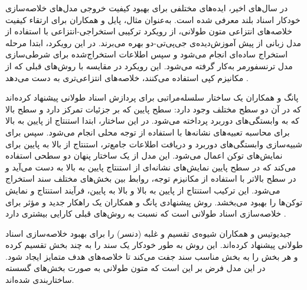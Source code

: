 
در سال‌های اخیر، ایده‌های مختلفی برای بهبود کیفیت خروجی مدل‌های خلاصه‌سازی خودکار اسناد بلند معرفی شده است. به‌عنوان مثال، پایل و همکاران برای ارتقاء کیفیت خلاصه‌های انتزاعی متون طولانی، از رویکرد ترکیبی استخراجی-انتزاعی با استفاده از مدل زبانی از پیش آموزش‌دیده‌ی جی‌پی‌تی-دو بهره می‌برند. در این رویکرد، ابتدا مرحله استخراج ساده‌ای انجام می‌شود و سپس اطلاعات استخراج‌شده برای شرطی‌سازی مدل ترنسفورمر به‌کار گرفته می‌شود. این رویکرد در مقایسه با روش‌های قبلی که از مکانیزم کپی استفاده می‌کنند، خلاصه‌های انتزاعی‌تری به دست می‌دهد \cite{pilault2020extractive}.

پانگ و همکاران یک ساختار سلسله‌مراتبی برای پردازش اسناد طولانی پیشنهاد کرده‌اند که در آن دو سطح مختلف وجود دارد: سطح پایین که بر جزئیات تمرکز دارد و سطح بالا که به وابستگی‌های دوربرد پرداخته می‌شود. در این ساختار، ابتدا استنتاج از پایین به بالا برای محاسبه تعبیه‌های نشانه‌ها با استفاده از توجه محلی انجام می‌شود. سپس برای شبیه‌سازی وابستگی‌های دوربرد و دریافت اطلاعات جامع‌تر، استنتاج از بالا به پایین برای نمایش‌های توکن اعمال می‌شود. این مدل از یک ساختار پنهان دو سطحی استفاده می‌کند که در سطح پایین نمایش‌های نشانه‌ای از استنتاج پایین به بالا به دست می‌آید و در سطح بالاتر با استفاده از مکانیزم توجه، روابط بین بخش‌های مختلف سند استخراج می‌شود. این ترکیب استنتاج از پایین به بالا و بالا به پایین، فرآیند استنتاج و نمایش توکن‌ها را بهبود می‌بخشد. روش پیشنهادی پانگ و همکاران یک راهکار جدید و مؤثر برای خلاصه‌سازی اسناد طولانی است که نسبت به روش‌های قبلی کارایی بیشتری دارد \cite{pang2023long}.



جیدیوتیس و همکاران شیوه‌ی تقسیم و غلبه (دنسر) را برای بهبود خلاصه‌سازی اسناد طولانی پیشنهاد کرده‌اند. این روش به طور خودکار یک سند را به چند بخش تقسیم کرده و هر بخش را به بخش مناسب سند جفت می‌کند تا خلاصه‌های هدف متمایز ایجاد شود. در این مدل فرض بر این است که متون طولانی به صورت بخش‌های گسسته ساختاربندی شده‌اند.

